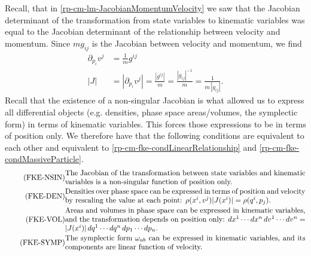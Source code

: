 Recall, that in \ref{rp-cm-lm-JacobianMomentumVelocity} we saw that the Jacobian determinant of the transformation from state variables to kinematic variables was equal to the Jacobian determinant of the relationship between velocity and momentum. Since $m g_{ij}$ is the Jacobian between velocity and momentum, we find
\begin{equation}\label{rp-cm-fke-metricTensorDeterminantIsJacobianForDensities}
	\begin{aligned}
		\partial_{p_i} v^j &= \frac{1}{m}g^{ij} \\
		|J| &= |\partial_{p_i} v^j | = \frac{|g^{ij}|}{m} = \frac{|g_{ij}|^{-1}}{m} = \frac{1}{m \,|g_{ij}|}. 
	\end{aligned}
\end{equation}
Recall that the existence of a non-singular Jacobian is what allowed us to express all differential objects (e.g. densities, phase space areas/volumes, the symplectic form) in terms of kinematic variables. This forces those expressions to be in terms of position only. We therefore have that the following conditions are equivalent to each other and equivalent to \ref{rp-cm-fke-condLinearRelationship} and \ref{rp-cm-fke-condMassiveParticle}.
\begin{align}
	\tag{FKE-NSIN}\label{rp-cm-fke-condJacobianOfPosition}
	&\eqtext{The Jacobian of the transformation between state variables and kinematic variables is a non-singular function of position only.} \\
	\tag{FKE-DEN}\label{rp-cm-fke-condDensitiesOfPosition}
	&\eqtext{Densities over phase space can be expressed in terms of position and velocity by rescaling the value at each point: $\rho(x^i, v^j) |J(x^i)| = \rho(q^i, p_j)$.} \\
	\tag{FKE-VOL}\label{rp-cm-fke-condAreasOfPosition}
	&\eqtext{Areas and volumes in phase space can be expressed in kinematic variables, and the transformation depends on position only: $dx^1 \cdots dx^n \, dv^1 \cdots dv^n = |J(x^i)| \, dq^1 \cdots dq^n \, dp_1 \cdots dp_n$.} \\
	\tag{FKE-SYMP}\label{rp-cm-fke-condSymplecticOfPosition}
	&\eqtext{The symplectic form $\omega_{ab}$ can be expressed in kinematic variables, and its components are linear function of velocity.}
\end{align}

